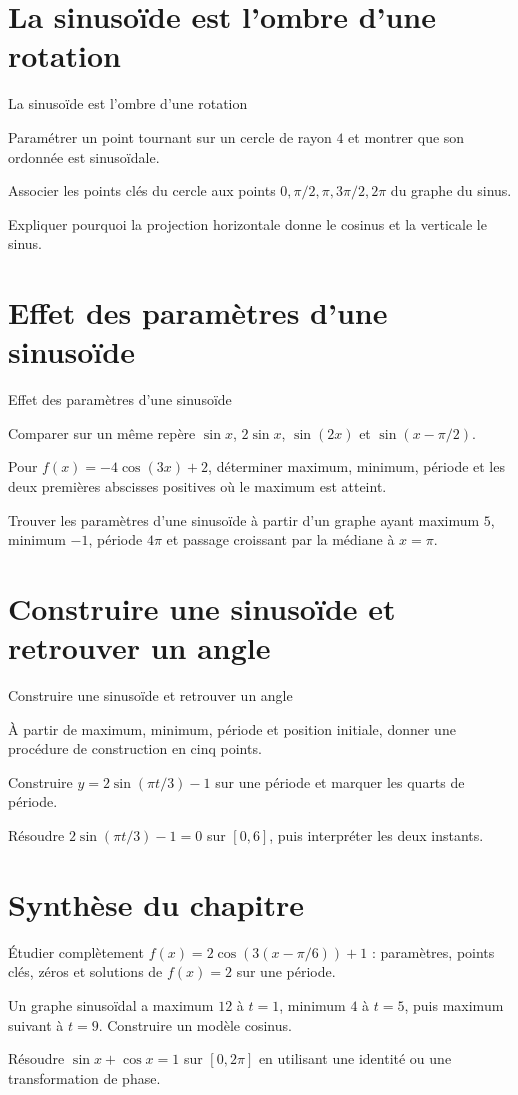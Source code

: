 \section{La sinusoïde est l'ombre d'une rotation}
\label{workbook:section:16.05}
\begin{exerciseblock}{La sinusoïde est l'ombre d'une rotation}
\item Paramétrer un point tournant sur un cercle de rayon $4$ et montrer que son ordonnée est sinusoïdale.
\item Associer les points clés du cercle aux points $0,\pi/2,\pi,3\pi/2,2\pi$ du graphe du sinus.
\item Expliquer pourquoi la projection horizontale donne le cosinus et la verticale le sinus.
\end{exerciseblock}
\section{Effet des paramètres d'une sinusoïde}
\label{workbook:section:16.06}
\begin{exerciseblock}{Effet des paramètres d'une sinusoïde}
\item Comparer sur un même repère $\sin x$, $2\sin x$, $\sin(2x)$ et $\sin(x-\pi/2)$.
\item Pour $f(x)=-4\cos(3x)+2$, déterminer maximum, minimum, période et les deux premières abscisses positives où le maximum est atteint.
\item Trouver les paramètres d'une sinusoïde à partir d'un graphe ayant maximum $5$, minimum $-1$, période $4\pi$ et passage croissant par la médiane à $x=\pi$.
\end{exerciseblock}
\section{Construire une sinusoïde et retrouver un angle}
\label{workbook:section:16.07}
\begin{exerciseblock}{Construire une sinusoïde et retrouver un angle}
\item À partir de maximum, minimum, période et position initiale, donner une procédure de construction en cinq points.
\item Construire $y=2\sin(\pi t/3)-1$ sur une période et marquer les quarts de période.
\item Résoudre $2\sin(\pi t/3)-1=0$ sur $[0,6]$, puis interpréter les deux instants.
\end{exerciseblock}
\section*{Synthèse du chapitre}
\begin{synthesisbox}
\item Étudier complètement $f(x)=2\cos(3(x-\pi/6))+1$ : paramètres, points clés, zéros et solutions de $f(x)=2$ sur une période.
\item Un graphe sinusoïdal a maximum $12$ à $t=1$, minimum $4$ à $t=5$, puis maximum suivant à $t=9$. Construire un modèle cosinus.
\item Résoudre $\sin x+\cos x=1$ sur $[0,2\pi]$ en utilisant une identité ou une transformation de phase.
\end{synthesisbox}
